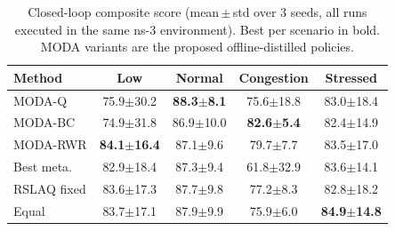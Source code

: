 \begin{table}[t]
\centering
\caption{Closed-loop composite score (mean\,$\pm$\,std over 3 seeds, all runs executed in the same ns-3 environment). Best per scenario in bold. MODA variants are the proposed offline-distilled policies.}
\label{tab:moda_scores}
\begin{tabular}{lcccc}
\toprule
Method & Low & Normal & Congestion & Stressed \\
\midrule
MODA-Q & 75.9$\pm$30.2 & \textbf{88.3$\pm$8.1} & 75.6$\pm$18.8 & 83.0$\pm$18.4 \\
MODA-BC & 74.9$\pm$31.8 & 86.9$\pm$10.0 & \textbf{82.6$\pm$5.4} & 82.4$\pm$14.9 \\
MODA-RWR & \textbf{84.1$\pm$16.4} & 87.1$\pm$9.6 & 79.7$\pm$7.7 & 83.5$\pm$17.0 \\
\midrule
Best meta. & 82.9$\pm$18.4 & 87.3$\pm$9.4 & 61.8$\pm$32.9 & 83.6$\pm$14.1 \\
RSLAQ fixed & 83.6$\pm$17.3 & 87.7$\pm$9.8 & 77.2$\pm$8.3 & 82.8$\pm$18.2 \\
Equal & 83.7$\pm$17.1 & 87.9$\pm$9.9 & 75.9$\pm$6.0 & \textbf{84.9$\pm$14.8} \\
\bottomrule
\end{tabular}
\end{table}
